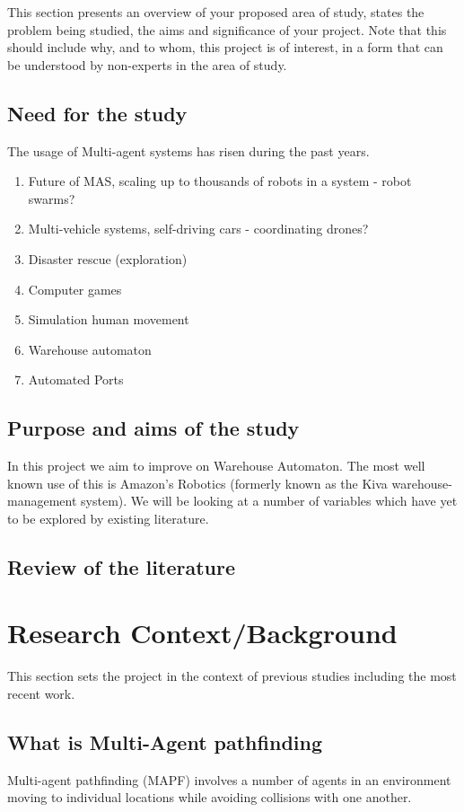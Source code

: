 \documentclass[a4paper,11pt]{article}
\begin{document}
This section presents an overview of your proposed area of study, states the problem being studied, the aims and significance of your project. Note that this should include why, and to whom, this project is of interest, in a form that can be understood by non-experts in the area of study.

\subsection{Need for the study}
The usage of Multi-agent systems has risen during the past years.  %

\begin{enumerate}
	\item Future of MAS, scaling up to thousands of robots in a system - robot swarms? \cite{Rubenstein2014}
	\item Multi-vehicle systems, self-driving cars - coordinating drones?
	\item Disaster rescue (exploration) \cite{konolige2006centibots} \cite{fox2006distributed}
	\item Computer games
	\item Simulation human movement
	\item Warehouse automaton
	\item Automated Ports
\end{enumerate}

\subsection{Purpose and aims of the study}
In this project we aim to improve on Warehouse Automaton. The most well known use of this is Amazon's Robotics (formerly known as the Kiva warehouse-management system). We will be looking at a number of variables which have yet to be explored by existing literature.

\subsection{Review of the literature}
\cite{wurman2008coordinating}


\section{Research Context/Background}
This section sets the project in the context of previous studies including the most recent work.

\subsection{What is Multi-Agent pathfinding}
Multi-agent pathfinding (MAPF) involves a number of agents in an environment moving to individual locations while avoiding collisions with one another.
\end{document}
